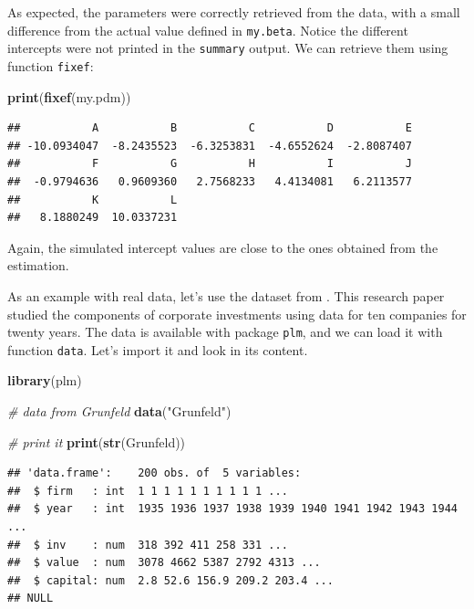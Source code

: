 \documentclass[11pt,]{book}
\newenvironment{Shaded}{\begin{snugshade}}{\end{snugshade}}
\newcommand{\KeywordTok}[1]{\textcolor[rgb]{0.27,0.27,0.27}{\textbf{#1}}}
\newcommand{\StringTok}[1]{\textcolor[rgb]{0.5,0.5,0.5}{#1}}
\newcommand{\CommentTok}[1]{\textcolor[rgb]{0.56,0.35,0.01}{\textit{#1}}}
\newcommand{\NormalTok}[1]{#1}
\begin{document}
As expected, the parameters were correctly retrieved from the data, with
a small difference from the actual value defined in \texttt{my.beta}.
Notice the different intercepts were not printed in the \texttt{summary}
output. We can retrieve them using function \texttt{fixef}:

\begin{Shaded}
\begin{Highlighting}[]
\KeywordTok{print}\NormalTok{(}\KeywordTok{fixef}\NormalTok{(my.pdm))}
\end{Highlighting}
\end{Shaded}

\begin{verbatim}
##           A           B           C           D           E 
## -10.0934047  -8.2435523  -6.3253831  -4.6552624  -2.8087407 
##           F           G           H           I           J 
##  -0.9794636   0.9609360   2.7568233   4.4134081   6.2113577 
##           K           L 
##   8.1880249  10.0337231
\end{verbatim}

Again, the simulated intercept values are close to the ones obtained
from the estimation.

As an example with real data, let's use the dataset from
\citet{grunfeld1958determinants}. This research paper studied the
components of corporate investments using data for ten companies for
twenty years. The data is available with package \texttt{plm}, and we
can load it with function \texttt{data}. Let's import it and look in its
content.

\begin{Shaded}
\begin{Highlighting}[]
\KeywordTok{library}\NormalTok{(plm)}

\CommentTok{# data from Grunfeld}
\KeywordTok{data}\NormalTok{(}\StringTok{"Grunfeld"}\NormalTok{)}

\CommentTok{# print it}
\KeywordTok{print}\NormalTok{(}\KeywordTok{str}\NormalTok{(Grunfeld))}
\end{Highlighting}
\end{Shaded}

\begin{verbatim}
## 'data.frame':    200 obs. of  5 variables:
##  $ firm   : int  1 1 1 1 1 1 1 1 1 1 ...
##  $ year   : int  1935 1936 1937 1938 1939 1940 1941 1942 1943 1944 ...
##  $ inv    : num  318 392 411 258 331 ...
##  $ value  : num  3078 4662 5387 2792 4313 ...
##  $ capital: num  2.8 52.6 156.9 209.2 203.4 ...
## NULL
\end{verbatim}
\end{document}
